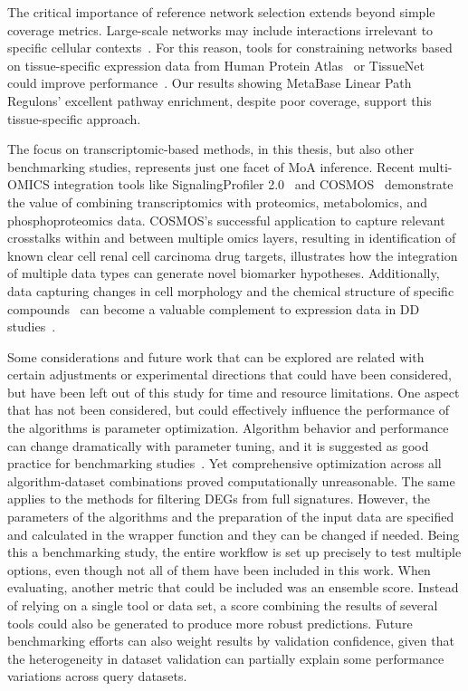 The critical importance of reference network selection extends beyond simple coverage metrics. Large-scale networks may include interactions irrelevant to specific cellular contexts~\cite{RN38}. For this reason, tools for constraining networks based on tissue-specific expression data from Human Protein Atlas~\cite{RN166} or TissueNet~\cite{RN137} could improve performance~\cite{RN38}. Our results showing MetaBase Linear Path Regulons' excellent pathway enrichment, despite poor coverage, support this tissue-specific approach.

The focus on transcriptomic-based methods, in this thesis, but also other benchmarking studies, represents just one facet of MoA inference. Recent multi-OMICS integration tools like SignalingProfiler 2.0~\cite{RN100} and COSMOS~\cite{RN99} demonstrate the value of combining transcriptomics with proteomics, metabolomics, and phosphoproteomics data. COSMOS's successful application to capture relevant crosstalks within and between multiple omics layers, resulting in identification of known clear cell renal cell carcinoma drug targets, illustrates how the integration of multiple data types can generate novel biomarker hypotheses. Additionally, data capturing changes in cell morphology and the chemical structure of specific compounds~\cite{RN167} can become a valuable complement to expression data in DD studies~\cite{RN38}. 

Some considerations and future work that can be explored are related with certain adjustments or experimental directions that could have been considered, but have been left out of this study for time and resource limitations. One aspect that has not been considered, but could effectively influence the performance of the algorithms is parameter optimization. Algorithm behavior and performance can change dramatically with parameter tuning, and it is suggested as good practice for benchmarking studies~\cite{RN108}. Yet comprehensive optimization across all algorithm-dataset combinations proved computationally unreasonable. The same applies to the methods for filtering DEGs from full signatures. However, the parameters of the algorithms and the preparation of the input data are specified and calculated in the wrapper function and they can be changed if needed. Being this a benchmarking study, the entire workflow is set up precisely to test multiple options, even though not all of them have been included in this work. When evaluating, another metric that could be included was an ensemble score. Instead of relying on a single tool or data set, a score combining the results of several tools could also be generated to produce more robust predictions. Future benchmarking efforts can also weight results by validation confidence, given that the heterogeneity in dataset validation can partially explain some performance variations across query datasets.

